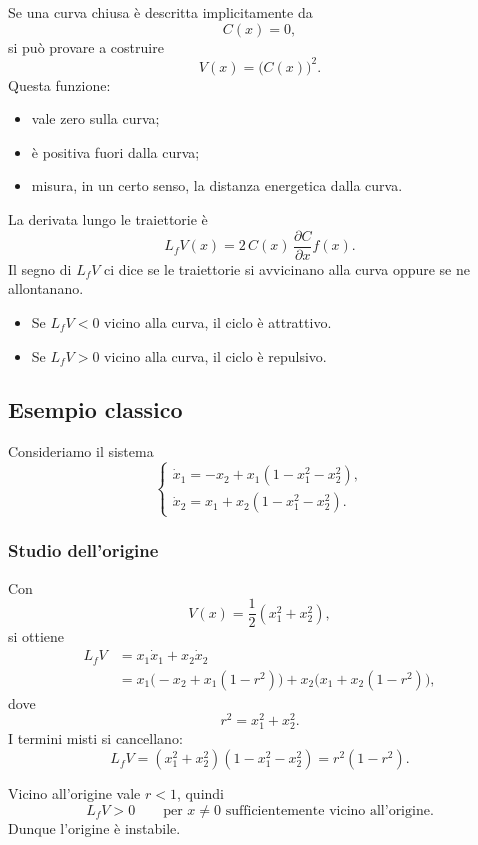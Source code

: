 Se una curva chiusa \`e descritta implicitamente da
\[
C(x)=0,
\]
si pu\`o provare a costruire
\[
V(x)=\bigl(C(x)\bigr)^2.
\]
Questa funzione:

\begin{itemize}
    \item vale zero sulla curva;
    \item \`e positiva fuori dalla curva;
    \item misura, in un certo senso, la distanza energetica dalla curva.
\end{itemize}

La derivata lungo le traiettorie \`e
\[
L_fV(x)=2\,C(x)\,\frac{\partial C}{\partial x}f(x).
\]
Il segno di \(L_fV\) ci dice se le traiettorie si avvicinano alla curva oppure se ne allontanano.

\begin{itemize}
    \item Se \(L_fV<0\) vicino alla curva, il ciclo \`e attrattivo.
    \item Se \(L_fV>0\) vicino alla curva, il ciclo \`e repulsivo.
\end{itemize}

\subsection{Esempio classico}

Consideriamo il sistema
\begin{equation}
\label{eq:L24-ciclo}
\begin{cases}
\dot x_1 = -x_2 + x_1(1-x_1^2-x_2^2),\\[4pt]
\dot x_2 = x_1 + x_2(1-x_1^2-x_2^2).
\end{cases}
\end{equation}

\subsubsection{Studio dell'origine}

Con
\[
V(x)=\frac12(x_1^2+x_2^2),
\]
si ottiene
\begin{align*}
L_fV
&= x_1\dot x_1 + x_2\dot x_2\\
&= x_1\bigl(-x_2 + x_1(1-r^2)\bigr)
+ x_2\bigl(x_1 + x_2(1-r^2)\bigr),
\end{align*}
dove
\[
r^2=x_1^2+x_2^2.
\]
I termini misti si cancellano:
\[
L_fV = (x_1^2+x_2^2)(1-x_1^2-x_2^2)=r^2(1-r^2).
\]

Vicino all'origine vale \(r<1\), quindi
\[
L_fV>0
\qquad \text{per } x\neq 0 \text{ sufficientemente vicino all'origine}.
\]
Dunque l'origine \`e instabile.

